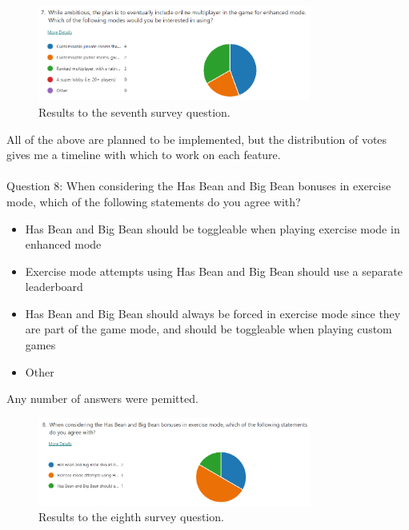 \documentclass{report}
\begin{document}
\begin{figure}[ht]
    \centering
    \includegraphics[width=0.8\textwidth]{survey7.png}
    \caption{\label{fig:survey7}Results to the seventh survey question.}
\end{figure}

All of the above are planned to be implemented, but the distribution of votes gives me a timeline with which to work on each feature.
\\\\
Question 8: When considering the Has Bean and Big Bean bonuses in exercise mode, which of the following statements do you agree with?
\begin{itemize}
    \renewcommand\labelitemi{--}
    \item Has Bean and Big Bean should be toggleable when playing exercise mode in enhanced mode
    \item Exercise mode attempts using Has Bean and Big Bean should use a separate leaderboard
    \item Has Bean and Big Bean should always be forced in exercise mode since they are part of the game mode, and should be toggleable when playing custom games
    \item Other
\end{itemize}
Any number of answers were pemitted.

\begin{figure}[ht]
    \centering
    \includegraphics[width=0.8\textwidth]{survey8.png}
    \caption{\label{fig:survey8}Results to the eighth survey question.}
\end{figure}
\end{document}
